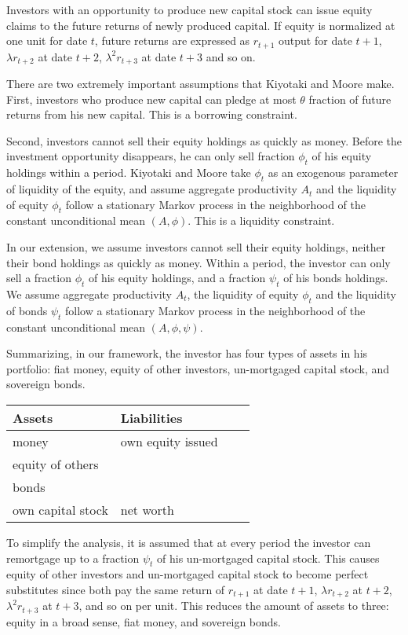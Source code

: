 \documentclass[12pt]{article}%
\begin{document}
Investors with an opportunity to produce new capital stock can issue equity
claims to the future returns of newly produced capital. If equity is normalized
at one unit for date $t$, future returns are expressed as $r_{t+1}$ output for
date $t+1$, $\lambda r_{t+2}$ at date $t+2$, $\lambda^{2} r_{t+3}$ at date $t+3$
and so on.

There are two extremely important assumptions that Kiyotaki and Moore make.
First, investors who produce new capital can pledge at most $\theta$ fraction of
future returns from his new capital. This is a borrowing constraint. 

Second, investors cannot sell their equity holdings as quickly
as money. Before the investment opportunity disappears, he can only sell
fraction $\phi_t$ of his equity holdings within a period. Kiyotaki and Moore take
$\phi_t$ as an exogenous parameter of liquidity of the equity, and assume
aggregate productivity $A_t$ and the liquidity of equity $\phi_t$ follow a
stationary Markov process in the neighborhood of the constant unconditional
mean $(A, \phi).$ This is a liquidity constraint.

In our extension, we assume investors cannot sell their equity holdings, neither
their bond holdings as quickly as money. Within a period, the investor can only
sell a fraction $\phi_t$ of his equity holdings, and a fraction $\psi_t$ of his bonds
holdings. We assume aggregate productivity $A_t$, the liquidity of equity $\phi_t$
and the liquidity of bonds $\psi_t$ follow a stationary Markov process in the
neighborhood of the constant unconditional mean  $(A, \phi, \psi).$ 

Summarizing, in our framework, the investor has four types of assets  in his portfolio: fiat
money, equity of other investors, un-mortgaged capital stock, and sovereign bonds. 

\begin{center}
    \begin{tabular}{ | l | l | l | p{5cm} |}
    \hline
    Assets & Liabilities \\ \hline
    money & own equity issued \\ \hline
    equity of others & \\ \hline
    bonds & \\ \hline
    own capital stock & net worth \\
    \hline
    \end{tabular}
\end{center}

To simplify the analysis, it is assumed that at every period the investor can
remortgage up to a fraction $\psi_t$ of his un-mortgaged capital stock. This
causes equity of other investors and un-mortgaged capital stock to become perfect
substitutes since both pay the same return of $r_{t+1}$ at date $t+1$, $\lambda r_{t+2}$
at $t+2$,  $\lambda^2 r_{t+3}$ at $t+3$, and so on per unit. This reduces the
amount of assets to three: equity in a broad sense, fiat money, and sovereign bonds.
 
\end{document}
